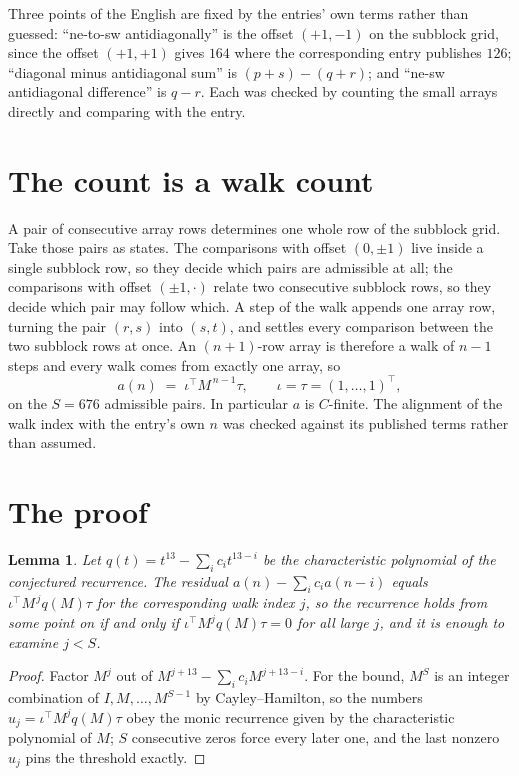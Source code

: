 \documentclass[11pt,a4paper]{article}
\theoremstyle{plain}
\newtheorem{lemma}[theorem]{Lemma}
\theoremstyle{definition}
\begin{document}
Three points of the English are fixed by the entries' own terms rather than guessed:
``ne-to-sw antidiagonally'' is the offset $(+1,-1)$ on the subblock grid, since the offset
$(+1,+1)$ gives $164$ where the corresponding entry publishes $126$; ``diagonal minus
antidiagonal sum'' is $(p+s)-(q+r)$; and ``ne-sw antidiagonal difference'' is $q-r$. Each was
checked by counting the small arrays directly and comparing with the entry.

\section{The count is a walk count}

A pair of consecutive array rows determines one whole row of the subblock grid. Take those
pairs as states. The comparisons with offset $(0,\pm1)$ live inside a single subblock row, so
they decide which pairs are admissible at all; the comparisons with offset $(\pm1,\cdot)$
relate two consecutive subblock rows, so they decide which pair may follow which. A step of the
walk appends one array row, turning the pair $(r,s)$ into $(s,t)$, and settles every comparison
between the two subblock rows at once. An $(n+1)$-row array is therefore a walk of $n-1$ steps
and every walk comes from exactly one array, so
\[
a(n)\;=\;\iota^{\!\top}M^{\,n-1}\tau,\qquad \iota=\tau=(1,\dots,1)^{\!\top},
\]
on the $S=676$ admissible pairs. In particular $a$ is $C$-finite. The alignment of the walk
index with the entry's own $n$ was checked against its published terms rather than assumed.

\section{The proof}

\begin{lemma}\label{lem:crit}
Let $q(t)=t^{13}-\sum_i c_it^{13-i}$ be the characteristic polynomial of the
conjectured recurrence. The residual $a(n)-\sum_ic_ia(n-i)$ equals
$\iota^{\!\top}M^{\,j}q(M)\tau$ for the corresponding walk index $j$, so the recurrence
holds from some point on if and only if $\iota^{\!\top}M^{j}q(M)\tau=0$ for all large $j$,
and it is enough to examine $j<S$.
\end{lemma}

\begin{proof}
Factor $M^{j}$ out of $M^{j+13}-\sum_ic_iM^{j+13-i}$. For the bound, $M^{S}$
is an integer combination of $I,M,\dots,M^{S-1}$ by Cayley--Hamilton, so the numbers
$u_j=\iota^{\!\top}M^{j}q(M)\tau$ obey the monic recurrence given by the characteristic
polynomial of $M$; $S$ consecutive zeros force every later one, and the last nonzero $u_j$
pins the threshold exactly.
\end{proof}
\end{document}
